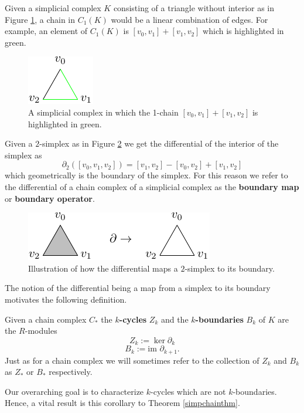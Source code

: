 \begin{example}
Given a simplicial complex $K$ consisting of a triangle without interior as in Figure \ref{trichain}, a chain in $C_{1}(K)$ would be a linear combination of edges. For example, an element of $C_{1}(K)$ is $[v_{0},v_{1}]+[v_{1},v_{2}]$ which is highlighted in green.
\begin{figure}[ht]
  \centering
  \includegraphics[scale=2]{trichain.pdf}
  \caption{\label{trichain} A simplicial complex in which the 1-chain $[v_{0},v_{1}]+[v_{1},v_{2}]$ is highlighted in green.}
\end{figure}
\end{example}

\begin{example}
Given a $2$-simplex as in Figure \ref{2simplex} we get the differential of the interior of the simplex as \[\partial_{2}([v_{0},v_{1},v_{2}])=[v_{1},v_{2}]-[v_{0},v_{2}]+[v_{1},v_{2}]\] which geometrically is the boundary of the simplex. For this reason we refer to the differential of a chain complex of a simplicial complex as the \textbf{boundary map} or \textbf{boundary operator}.
\begin{figure}[ht]
  \centering
  \includegraphics[scale=2]{partialtri.pdf}
  \caption{\label{2simplex} Illustration of how the differential maps a $2$-simplex to its boundary.}
\end{figure}
\end{example}
The notion of the differential being a map from a simplex to its boundary motivates the following definition.
\begin{definition}
  Given a chain complex $C_{*}$ the \textbf{$k$-cycles} $Z_{k}$  and the \textbf{$k$-boundaries} $B_{k}$ of $K$ are the $R$-modules
  \[ Z_{k} := \ker \partial_{k}\]
  \[ B_{k} := \textrm{im } \partial_{k+1}.\]
  Just as for a chain complex we will sometimes refer to the collection of $Z_{k}$ and $B_{k}$ as $Z_{*}$ or $B_{*}$ respectively.
\end{definition}
Our overarching goal is to characterize $k$-cycles which are not $k$-boundaries. Hence, a vital result is this corollary to Theorem \ref{simpchainthm}.

